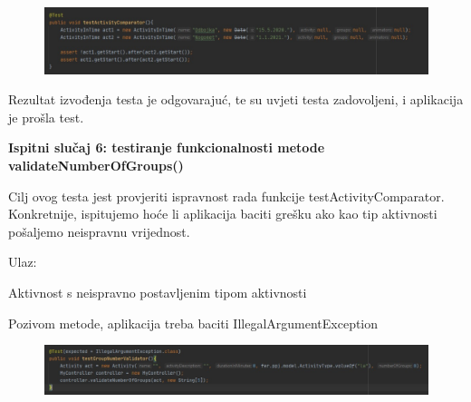 		\begin{figure}[H]
            \includegraphics[width=15cm]{dokumentacija/slike/testRaspored.PNG} %
            \centering
            \label{fig:promjene}
            \end{figure}
			
		Rezultat izvođenja testa je odgovarajuć, te su uvjeti testa zadovoljeni, i aplikacija je prošla test.
		
		\vspace{10mm} %
		
		\textbf{Ispitni slučaj 6: testiranje funkcionalnosti metode validateNumberOfGroups() }
			
		Cilj ovog testa jest provjeriti ispravnost rada funkcije testActivityComparator. Konkretnije, ispitujemo hoće li aplikacija baciti grešku ako kao tip aktivnosti pošaljemo neispravnu vrijednost.
		
		\vspace{3mm} %
		Ulaz:
		\noindent
		\begin{packed_enum}
		    \item Aktivnost s neispravno postavljenim tipom aktivnosti
		\end{packed_enum}
		
		\noindent
		\begin{packed_enum}
		    \item Pozivom metode, aplikacija treba baciti IllegalArgumentException

		\end{packed_enum}
		
		\begin{figure}[H]
            \includegraphics[width=15cm]{dokumentacija/slike/testGrupa.PNG} %
            \centering
            \label{fig:promjene}
            \end{figure}
			

